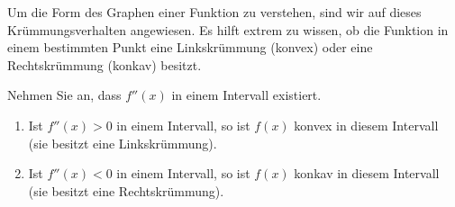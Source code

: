 





Um die Form des Graphen einer Funktion zu verstehen, sind wir auf dieses Krümmungsverhalten angewiesen. Es hilft extrem zu wissen, ob die Funktion in einem bestimmten Punkt eine Linkskrümmung (konvex) oder eine Rechtskrümmung (konkav) besitzt.

\begin{mainTheorem}
Nehmen Sie an, dass $f''(x)$ in einem Intervall existiert.
\begin{enumerate}
\item Ist $f''(x)>0$ in einem Intervall, so ist $f(x)$ konvex in diesem Intervall (sie besitzt eine Linkskrümmung).
\item Ist $f''(x)<0$ in einem Intervall, so ist $f(x)$ konkav in diesem Intervall  (sie besitzt eine Rechtskrümmung).
\end{enumerate}
\end{mainTheorem}


